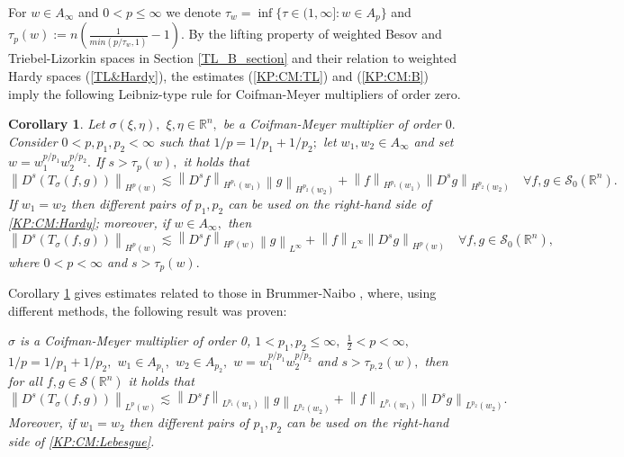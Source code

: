 \documentclass[10pt,a4paper]{article}
\newtheorem{corollary}[theorem]{Corollary}
\theoremstyle{remark}
\newcommand{\rn}{{{\mathbb R}^n}}
\newcommand{\sw}{{\mathcal{S}}(\rn)}
\newcommand{\swz}{{\mathcal{S}_0}(\rn)}
\newcommand{\norm}[2]{\left\|#1\right\|_{#2}}
\newcommand{\hcline}{1/p=1/p_1+1/p_2}
\begin{document}
For $w \in A_\infty$ and $0<p\leq\infty$ we denote 
$\tau_w = \inf\{\tau\in(1,\infty]: w\in A_p\}$ and 
 $\tau_p(w) := n\left( \frac{1}{min(p/\tau_w,1)} - 1 \right).$  By the lifting property of weighted Besov and Triebel-Lizorkin spaces in Section \ref{TL_B_section} and their relation to weighted Hardy spaces (\ref{TL&Hardy}), the estimates (\ref{KP:CM:TL}) and (\ref{KP:CM:B}) imply the following Leibniz-type rule for Coifman-Meyer multipliers of order zero.

\begin{corollary}\label{coro:KP:CM:Hardy}  Let $\sigma(\xi,\eta),$ $\xi,\eta\in\rn,$ be a Coifman-Meyer multiplier of order $0.$ 
Consider  $0 < p, p_1, p_2  < \infty$  such that $\hcline;$ let  $w_1,w_2\in A_\infty$ and set $w=w_1^{{p}/{p_1}} w_2^{{p}/{p_2}}.$ 
If  $s > \tau_p(w),$ it holds that
\begin{equation}\label{KP:CM:Hardy}
\norm{D^s(T_\sigma(f,g))}{H^p(w)} \lesssim \norm{D^s f}{H^{p_1}(w_1)} \norm{g}{H^{p_2}(w_2)} +  \norm{f}{H^{p_1}(w_1)}   \norm{D^s g}{H^{p_2}(w_2)} \quad \forall f, g \in \swz.
\end{equation}
If $w_1=w_2$ then different pairs of $p_1, p_2$ can be used on the right-hand side of \eqref{KP:CM:Hardy}; moreover, if $w\in A_\infty,$ then 
\begin{equation}\label{Kp:CM:Hardy2}
\norm{D^s(T_\sigma(f,g))}{H^p(w)} \lesssim \norm{D^s f}{H^{p}(w)} \norm{g}{L^\infty} +  \norm{f}{L^\infty}   \norm{D^s g}{H^{p}(w)} \quad \forall f, g \in \swz,
\end{equation}
where $0<p<\infty$ and $s>\tau_{p}(w).$

\end{corollary}

Corollary \ref{coro:KP:CM:Hardy} gives estimates related to those in Brummer-Naibo \cite{BrNa2017}, where, using different methods, the following result was proven:

\textit{$\sigma$ is a Coifman-Meyer multiplier of order 0, $1<p_1,p_2\le \infty,$ $\frac{1}{2}<p<\infty,$ $\hcline,$  $w_1\in A_{p_1},$ $w_2\in A_{p_2},$ $w=w_1^{{p}/{p_1}} w_2^{{p}/{p_2}}$ and $s>\tau_{p,2}(w),$ then for all $f,g\in \sw$ it holds that
\begin{equation}\label{KP:CM:Lebesgue}
\norm{D^s(T_\sigma(f,g))}{L^p(w)} \lesssim \norm{D^s f}{L^{p_1}(w_1)} \norm{g}{L^{p_2}(w_2)} +  \norm{f}{L^{p_1}(w_1)}   \norm{D^s g}{L^{p_2}(w_2)}. 
\end{equation}
Moreover, if $w_1=w_2$ then different pairs of $p_1, p_2$ can be used on the right-hand side of \eqref{KP:CM:Lebesgue}.
}
\end{document}
